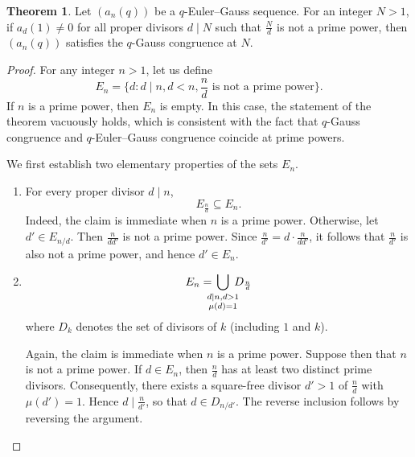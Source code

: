 \documentclass{article}
\numberwithin{equation}{section}
\theoremstyle{definition}
\newtheorem{theorem}[definition]{\bf {Theorem}}
\begin{document}
\begin{theorem}\label{thm:2}   
    Let $(a_n(q))$ be a $q$-Euler--Gauss sequence. For an integer $N>1$, if $a_d(1)\neq0$ for all proper divisors $d\mid N$ such that $\frac{N}{d}$ is not a prime power, then $(a_n(q))$ satisfies the $q$-Gauss congruence at $N$.
\end{theorem}
\begin{proof}
For any integer $n>1$, let us define
\[E_n=\{d: d\mid n, d<n, \frac{n}{d}\text{ is not a prime power}\}.\]
If $n$ is a prime power, then $E_n$ is empty. In this case, the statement of the theorem vacuously holds, which is consistent with the fact that $q$-Gauss congruence and $q$-Euler--Gauss congruence coincide at prime powers.

We first establish two elementary properties of the sets $E_n$.
\begin{enumerate}[label=(\roman*.)]
    \item For every proper divisor $d\mid n$, \[E_\frac{n}{d}\subseteq E_n.\]  
    Indeed, the claim is immediate when $n$ is a prime power. Otherwise, let $d'\in E_{n/d}$. Then $\frac{n}{dd'}$ is not a prime power. Since $\frac{n}{d'}=d\cdot\frac{n}{dd'}$, it follows that $\frac{n}{d'}$ is also not a prime power, and hence $d'\in E_n$.
    \item \[E_n=\hspace{-2.5mm}\bigcup\limits_{\substack{d\mid n, d>1\\\mu(d)=1}}\hspace{-2mm}D_\frac{n}{d}\] 
    where $D_k$ denotes the set of divisors of $k$ (including $1$ and $k$).
    
    Again, the claim is immediate when $n$ is a prime power. Suppose then that $n$ is not a prime power. If $d\in E_n$, then $\frac{n}{d}$ has at least two distinct prime divisors. Consequently, there exists a square-free divisor $d'>1$ of $\frac{n}{d}$ with $\mu(d')=1$. Hence $d\mid \frac{n}{d'}$, so that $d\in D_{n/d'}$. The reverse inclusion follows by reversing the argument.
\end{enumerate}


\end{proof}
\end{document}
